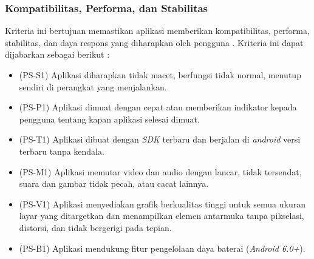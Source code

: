 \subsubsection{Kompatibilitas, Performa, dan Stabilitas}
Kriteria ini bertujuan memastikan aplikasi memberikan kompatibilitas, performa, stabilitas, dan daya respons yang diharapkan oleh pengguna \cite{androiddev}. Kriteria ini dapat dijabarkan sebagai berikut : 
\begin{itemize}
    \item (PS-S1) Aplikasi diharapkan tidak macet, berfungsi tidak normal, menutup sendiri di perangkat yang menjalankan.
    \item (PS-P1) Aplikasi dimuat dengan cepat atau memberikan indikator kepada pengguna tentang kapan aplikasi selesai dimuat.
    \item (PS-T1) Aplikasi dibuat dengan \textit{SDK} terbaru dan berjalan di \textit{android} versi terbaru tanpa kendala.
    \item (PS-M1) Aplikasi memutar video dan audio dengan lancar, tidak tersendat, suara dan gambar tidak pecah, atau cacat lainnya.
    \item (PS-V1) Aplikasi menyediakan grafik berkualitas tinggi untuk semua ukuran layar yang ditargetkan dan menampilkan elemen antarmuka tanpa pikselasi, distorsi, dan tidak bergerigi pada tepian.
    \item (PS-B1) Aplikasi mendukung fitur pengelolaan daya baterai (\textit{Android 6.0+}).  
\end{itemize}   

